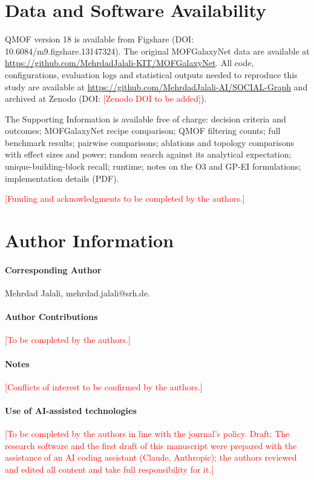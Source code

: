 \documentclass[journal=jcisd8,manuscript=article]{achemso}
\newcommand{\placeholder}[1]{\textcolor{red}{[#1]}}
\begin{document}
\section{Data and Software Availability}
QMOF version 18 is available from Figshare (DOI: 10.6084/m9.figshare.13147324). The original MOFGalaxyNet data are available at \url{https://github.com/MehrdadJalali-KIT/MOFGalaxyNet}. All code, configurations, evaluation logs and statistical outputs needed to reproduce this study are available at \url{https://github.com/MehrdadJalali-AI/SOCIAL-Graph} and archived at Zenodo (DOI: \placeholder{Zenodo DOI to be added}).

\begin{suppinfo}
The Supporting Information is available free of charge: decision criteria and outcomes; MOFGalaxyNet recipe comparison; QMOF filtering counts; full benchmark results; pairwise comparisons; ablations and topology comparisons with effect sizes and power; random search against its analytical expectation; unique-building-block recall; runtime; notes on the O3 and GP-EI formulations; implementation details (PDF).
\end{suppinfo}

\begin{acknowledgement}
\placeholder{Funding and acknowledgments to be completed by the authors.}
\end{acknowledgement}

\section*{Author Information}
\paragraph{Corresponding Author} Mehrdad Jalali, mehrdad.jalali@srh.de.
\paragraph{Author Contributions} \placeholder{To be completed by the authors.}
\paragraph{Notes} \placeholder{Conflicts of interest to be confirmed by the authors.}
\paragraph{Use of AI-assisted technologies} \placeholder{To be completed by the authors in line with the journal's policy. Draft: The research software and the first draft of this manuscript were prepared with the assistance of an AI coding assistant (Claude, Anthropic); the authors reviewed and edited all content and take full responsibility for it.}


\end{document}
